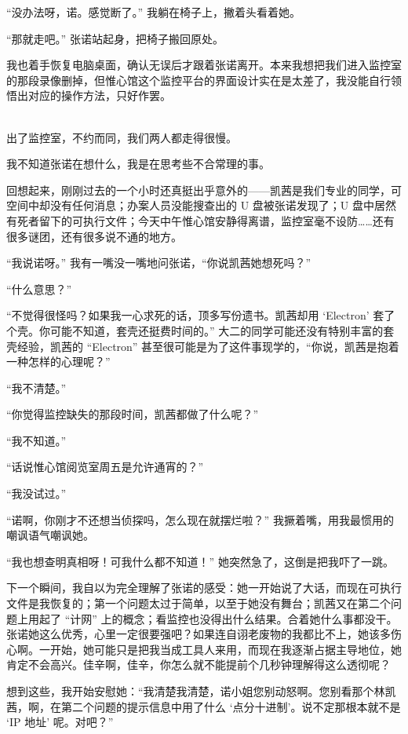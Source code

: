 \documentclass[UTF8]{ctexart}
\begin{document}
“没办法呀，诺。感觉断了。” 我躺在椅子上，撇着头看着她。

“那就走吧。” 张诺站起身，把椅子搬回原处。

我也着手恢复电脑桌面，确认无误后才跟着张诺离开。本来我想把我们进入监控室的那段录像删掉，但惟心馆这个监控平台的界面设计实在是太差了，我没能自行领悟出对应的操作方法，只好作罢。

~\\

出了监控室，不约而同，我们两人都走得很慢。

我不知道张诺在想什么，我是在思考些不合常理的事。

回想起来，刚刚过去的一个小时还真挺出乎意外的——凯茜是我们专业的同学，可空间中却没有任何消息；办案人员没能搜查出的 U 盘被张诺发现了；U 盘中居然有死者留下的可执行文件；今天中午惟心馆安静得离谱，监控室毫不设防……还有很多谜团，还有很多说不通的地方。

“我说诺呀。” 我有一嘴没一嘴地问张诺，“你说凯茜她想死吗？”

“什么意思？”

“不觉得很怪吗？如果我一心求死的话，顶多写份遗书。凯茜却用 ‘Electron’ 套了个壳。你可能不知道，套壳还挺费时间的。” 大二的同学可能还没有特别丰富的套壳经验，凯茜的 “Electron” 甚至很可能是为了这件事现学的，“你说，凯茜是抱着一种怎样的心理呢？”

“我不清楚。”

“你觉得监控缺失的那段时间，凯茜都做了什么呢？”

“我不知道。”

“话说惟心馆阅览室周五是允许通宵的？”

“我没试过。”

“诺啊，你刚才不还想当侦探吗，怎么现在就摆烂啦？” 我撅着嘴，用我最惯用的嘲讽语气嘲讽她。

“我也想查明真相呀！可我什么都不知道！” 她突然急了，这倒是把我吓了一跳。

下一个瞬间，我自以为完全理解了张诺的感受：她一开始说了大话，而现在可执行文件是我恢复的；第一个问题太过于简单，以至于她没有舞台；凯茜又在第二个问题上用起了 “计网” 上的概念；看监控也没得出什么结果。合着她什么事都没干。张诺她这么优秀，心里一定很要强吧？如果连自诩老废物的我都比不上，她该多伤心啊。一开始，她可能只是把我当成工具人来用，而现在我逐渐占据主导地位，她肯定不会高兴。佳辛啊，佳辛，你怎么就不能提前个几秒钟理解得这么透彻呢？

想到这些，我开始安慰她：“我清楚我清楚，诺小姐您别动怒啊。您别看那个林凯茜，啊，在第二个问题的提示信息中用了什么 ‘点分十进制’。说不定那根本就不是 ‘IP 地址’ 呢。对吧？”
\end{document}

